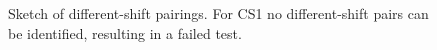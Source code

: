 \documentclass[12pt]{article}
\begin{document}
\begin{appendix}
\begin{figure}[hbtp]
\caption{\label{diff-shift-failure}Sketch of different-shift pairings. For CS1 no different-shift pairs can be identified, resulting in a failed test.}
\end{figure}



\end{appendix}



\end{document}

